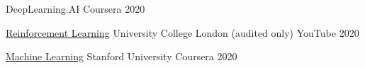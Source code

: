 \begin{cvhonors}

  \cvhonor
    {\dlspec} %
    {DeepLearning.AI} %
    {Coursera} %
    {2020} %

%
%
%
%


  \cvhonor
    {\href{https://www.youtube.com/watch?v=2pWv7GOvuf0&list=PLqYmG7hTraZBiG_XpjnPrSNw-1XQaM_gB}{Reinforcement Learning}} %
    {University College London (audited only)} %
    {YouTube} %
    {2020} %

  \cvhonor
    {\href{https://www.coursera.org/account/accomplishments/certificate/2XNJSGPREAQY}{Machine Learning}} %
    {Stanford University} %
    {Coursera} %
    {2020} %

\end{cvhonors}
